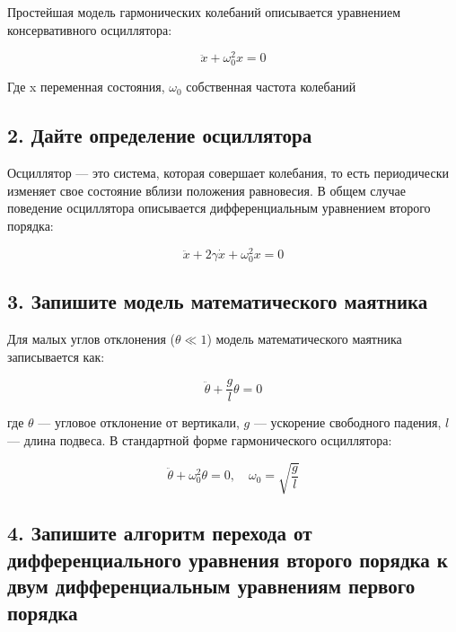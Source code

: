 \documentclass[
  12pt,
  a4paper,
  DIV=11,
  numbers=noendperiod]{scrreprt}
\begin{document}
Простейшая модель гармонических колебаний описывается уравнением
консервативного осциллятора:

\[
\ddot{x} + \omega_0^2 x = 0
\]

Где x переменная состояния, \(\omega_0\) собственная частота колебаний

\subsection{2. Дайте определение
осциллятора}\label{ux434ux430ux439ux442ux435-ux43eux43fux440ux435ux434ux435ux43bux435ux43dux438ux435-ux43eux441ux446ux438ux43bux43bux44fux442ux43eux440ux430}

Осциллятор --- это система, которая совершает колебания, то есть
периодически изменяет свое состояние вблизи положения равновесия. В
общем случае поведение осциллятора описывается дифференциальным
уравнением второго порядка:

\[
\ddot{x} + 2\gamma \dot{x} + \omega_0^2 x = 0
\]

\subsection{3. Запишите модель математического
маятника}\label{ux437ux430ux43fux438ux448ux438ux442ux435-ux43cux43eux434ux435ux43bux44c-ux43cux430ux442ux435ux43cux430ux442ux438ux447ux435ux441ux43aux43eux433ux43e-ux43cux430ux44fux442ux43dux438ux43aux430}

Для малых углов отклонения (\(\theta \ll 1\)) модель математического
маятника записывается как:

\[
\ddot{\theta} + \frac{g}{l} \theta = 0
\]

где \(\theta\) --- угловое отклонение от вертикали, \(g\) --- ускорение
свободного падения, \(l\) --- длина подвеса. В стандартной форме
гармонического осциллятора:

\[
\ddot{\theta} + \omega_0^2 \theta = 0, \quad \omega_0 = \sqrt{\frac{g}{l}}
\]

\subsection{4. Запишите алгоритм перехода от дифференциального уравнения
второго порядка к двум дифференциальным уравнениям первого
порядка}\label{ux437ux430ux43fux438ux448ux438ux442ux435-ux430ux43bux433ux43eux440ux438ux442ux43c-ux43fux435ux440ux435ux445ux43eux434ux430-ux43eux442-ux434ux438ux444ux444ux435ux440ux435ux43dux446ux438ux430ux43bux44cux43dux43eux433ux43e-ux443ux440ux430ux432ux43dux435ux43dux438ux44f-ux432ux442ux43eux440ux43eux433ux43e-ux43fux43eux440ux44fux434ux43aux430-ux43a-ux434ux432ux443ux43c-ux434ux438ux444ux444ux435ux440ux435ux43dux446ux438ux430ux43bux44cux43dux44bux43c-ux443ux440ux430ux432ux43dux435ux43dux438ux44fux43c-ux43fux435ux440ux432ux43eux433ux43e-ux43fux43eux440ux44fux434ux43aux430}
\end{document}
